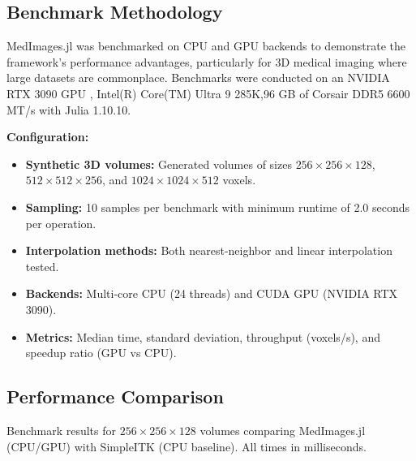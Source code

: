 \documentclass[a4paper,10pt]{elsarticle}
\begin{document}
  \subsection{Benchmark Methodology}
  MedImages.jl was benchmarked on CPU and GPU backends to demonstrate the framework's performance advantages, particularly for 3D medical imaging where large datasets are commonplace. Benchmarks were conducted on an NVIDIA RTX 3090 GPU ,
  Intel(R) Core(TM) Ultra 9 285K,96 GB of Corsair DDR5  6600 MT/s  with Julia 1.10.10.

  \textbf{Configuration:}
  \begin{itemize}
      \item \textbf{Synthetic 3D volumes:} Generated volumes of sizes $256 \times 256 \times 128$, $512 \times 512 \times 256$, and $1024 \times 1024 \times 512$ voxels.
      \item \textbf{Sampling:} 10 samples per benchmark with minimum runtime of 2.0 seconds per operation.
      \item \textbf{Interpolation methods:} Both nearest-neighbor and linear interpolation tested.
      \item \textbf{Backends:} Multi-core CPU (24 threads) and CUDA GPU (NVIDIA RTX 3090).
      \item \textbf{Metrics:} Median time, standard deviation, throughput (voxels/s), and speedup ratio (GPU vs CPU).
  \end{itemize}

  \subsection{Performance Comparison}

  Benchmark results for $256 \times 256 \times 128$ volumes comparing MedImages.jl (CPU/GPU) with SimpleITK (CPU baseline). All times in milliseconds.
\end{document}
